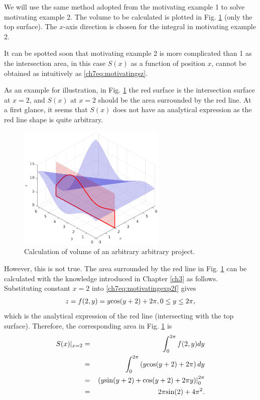We will use the same method adopted from the motivating example 1 to solve motivating example 2. The volume to be calculated is plotted in Fig. \ref{ch7fig:motivatingexp2} (only the top surface). The $x$-axis direction is chosen for the integral in motivating example 2.

It can be spotted soon that motivating example 2 is more complicated than 1 as the intersection area, in this case $S(x)$ as a function of position $x$, cannot be obtained as intuitively as \eqref{ch7eq:motivatingsz}.

As an example for illustration, in Fig. \ref{ch7fig:motivatingexp2} the red surface is the intersection surface at $x=2$, and $S(x)$ at $x=2$ should be the area surrounded by the red line. At a first glance, it seems that $S(x)$ does not have an analytical expression as the red line shape is quite arbitrary.

\begin{figure}
	\centering
	\includegraphics[width=200pt]{chapters/part-2/figures/motivatingexp2.eps}
	\caption{Calculation of volume of an arbitrary arbitrary project.} \label{ch7fig:motivatingexp2}
\end{figure}

However, this is not true. The area surrounded by the red line in Fig. \ref{ch7fig:motivatingexp2} can be calculated with the knowledge introduced in Chapter \ref{ch3} as follows. Substituting constant $x=2$ into \eqref{ch7eq:motivatingexp2f} gives
\begin{eqnarray}
	z = f(2,y) = y\textup{cos}(y+2) + 2\pi, 0\leq y\leq2\pi, \nonumber
\end{eqnarray}
which is the analytical expression of the red line (intersecting with the top surface). Therefore, the corresponding area in Fig. \ref{ch7fig:motivatingexp2} is
\begin{eqnarray}
	S(x)|_{x=2} &=& \int_{0}^{2\pi} f(2,y) dy \nonumber \\ &=& \int_{0}^{2\pi}\left(y\textup{cos}(y+2) + 2\pi\right)dy \nonumber \\
	&=& \left.\left(y\textup{sin}(y+2)+\textup{cos}(y+2) + 2\pi y\right)\right|_{0}^{2\pi} \nonumber \\
	&=& 2\pi\textup{sin}(2) + 4\pi^2. \nonumber
\end{eqnarray}

